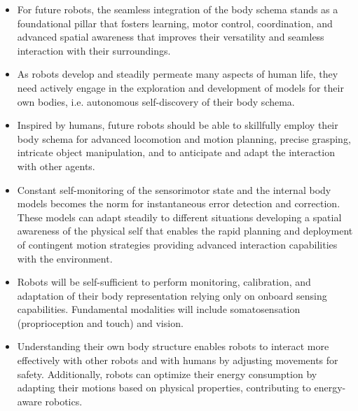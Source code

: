 \documentclass[12pt, a4paper]{article}
\begin{document}
\begin{itemize}
	\item For future robots, the seamless integration of the body schema stands as a foundational pillar that fosters learning, motor control, coordination, and advanced spatial awareness that improves their versatility and seamless interaction with their surroundings.

    \item As robots develop and steadily permeate many aspects of human life, they need actively engage in the exploration and development of models for their own bodies, i.e. autonomous self-discovery of their body schema.

	\item Inspired by humans, future robots should be able to skillfully employ their body schema for advanced locomotion and motion planning, precise grasping, intricate object manipulation, and to anticipate and adapt the interaction with other agents.
		
	\item Constant self-monitoring of the sensorimotor state and the internal body models becomes the norm for instantaneous error detection and correction. These models can adapt steadily to different situations developing a spatial awareness of the physical self that enables the rapid planning and deployment of contingent motion strategies providing advanced interaction capabilities with the environment.

    \item Robots will be self-sufficient to perform monitoring, calibration, and adaptation of their body representation relying only on onboard sensing capabilities. Fundamental modalities will include somatosensation (proprioception and touch) and vision.
 
	\item Understanding their own body structure enables robots to interact more effectively with other robots and with humans by adjusting movements for safety. Additionally, robots can optimize their energy consumption by adapting their motions based on physical properties, contributing to energy-aware robotics.

\end{itemize}
\end{document}
